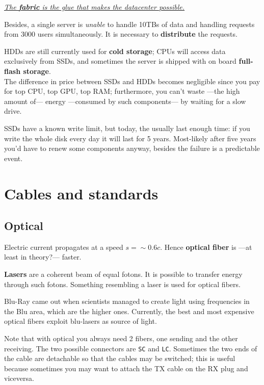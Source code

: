 \begin{center}
   \ul{\textit{The \textbf{fabric} is the glue that makes the datacenter possible.}}
\end{center}

Besides, a single server is \textit{unable} to handle 10TBs of data and handling requests from 3000 users simultaneously. It is necessary to \textbf{distribute} the requests.

HDDs are still currently used for \textbf{cold storage};
CPUs will access data exclusively from SSDs, and sometimes the server is shipped with on board \textbf{full-flash storage}.\\
The difference in price between SSDs and HDDs becomes negligible since you pay for top CPU, top GPU, top RAM;
furthermore, you can't waste ---the high amount of--- energy ---consumed by such components--- by waiting for a slow drive.

SSDs have a known write limit, but today, the usually last enough time: if you write the whole disk every day it will last for 5 years. Most-likely after five years you'd have to renew some components anyway, besides the failure is a predictable event.

\section{Cables and standards}
\subsection{Optical}
Electric current propagates at a speed $s = {\sim}0.6c$.
Hence \textbf{optical fiber} is ---at least in theory?--- faster.

\textbf{Lasers} are a coherent beam of equal fotons. It is possible to transfer energy through such fotons. Something resembling a laser is used for optical fibers.

Blu-Ray came out when scientists managed to create light using frequencies in the Blu area, which are the higher ones.
Currently, the best and most expensive optical fibers exploit blu-lasers as source of light.

Note that with optical you always need 2 fibers, one sending and the other receiving. The two possible connectors are \texttt{SC} and \texttt{LC}.
Sometimes the two ends of the cable are detachable so that the cables may be switched; this is useful because sometimes you may want to attach the TX cable on the RX plug and viceversa. 

